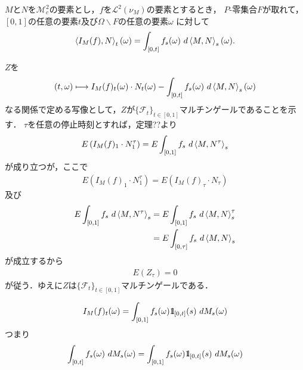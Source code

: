 	\begin{screen}
		\begin{thm}
			$M$と$N$を$\mathscr{M}_{c}^{2}$の要素とし，$f$を$\mathscr{L}^{2}(\nu_{M})$の要素とするとき，
			$P$-零集合$F$が取れて，$[0,1]$の任意の要素$t$及び$\Omega \backslash F$の任意の要素$\omega$
			に対して
			\begin{align}
				\inprod<I_{M}(f),N>_{t}(\omega)
				= \int_{[0,t]} f_{s}(\omega)\ d\inprod<M,N>_{s}(\omega).
			\end{align}
		\end{thm}
	\end{screen}
	
	\begin{sketch}
		$Z$を
		\begin{align}
			(t,\omega) \longmapsto I_{M}(f)_{t}(\omega) \cdot N_{t}(\omega)
			- \int_{[0,t]} f_{s}(\omega)\ d\inprod<M,N>_{s}(\omega)
		\end{align}
		なる関係で定める写像として，$Z$が$\{\mathscr{F}_{t}\}_{t \in [0,1]}$マルチンゲールであることを示す．
		$\tau$を任意の停止時刻とすれば，定理??より
		\begin{align}
			E\left(I_{M}(f)_{1} \cdot N^{\tau}_{1}\right)
			= E\int_{[0,1]} f_{s}\ d\inprod<M,N^{\tau}>_{s}
		\end{align}
		が成り立つが，ここで
		\begin{align}
			E\left(I_{M}(f)_{1} \cdot N^{\tau}_{1}\right)
			= E\left(I_{M}(f)_{\tau} \cdot N_{\tau}\right)
		\end{align}
		及び
		\begin{align}
			E\int_{[0,1]} f_{s}\ d\inprod<M,N^{\tau}>_{s}
			&= E\int_{[0,1]} f_{s}\ d\inprod<M,N>^{\tau}_{s} \\
			&= E\int_{[0,\tau]} f_{s}\ d\inprod<M,N>_{s}
		\end{align}
		が成立するから
		\begin{align}
			E(Z_{\tau}) = 0
		\end{align}
		が従う．ゆえに$Z$は$\{\mathscr{F}_{t}\}_{t \in [0,1]}$マルチンゲールである．
	\end{sketch}
	
	\begin{screen}
		\begin{thm}
			\begin{align}
				I_{M}(f)_{t}(\omega) = \int_{[0,1]} f_{s}(\omega)\mbox{1}\hspace{-0.25em}\mbox{l}_{[0,t]}(s)\ dM_{s}(\omega)
			\end{align}
			つまり
			\begin{align}
				\int_{[0,t]} f_{s}(\omega)\ dM_{s}(\omega) = \int_{[0,1]} f_{s}(\omega)\mbox{1}\hspace{-0.25em}\mbox{l}_{[0,t]}(s)\ dM_{s}(\omega)
			\end{align}
		\end{thm}
	\end{screen}